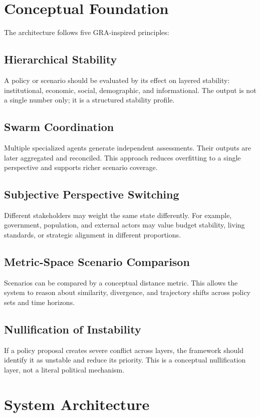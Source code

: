 \documentclass[11pt,a4paper]{article}
\begin{document}
\section{Conceptual Foundation}

The architecture follows five GRA-inspired principles:

\subsection{Hierarchical Stability}
A policy or scenario should be evaluated by its effect on layered stability: institutional, economic, social, demographic, and informational. The output is not a single number only; it is a structured stability profile.

\subsection{Swarm Coordination}
Multiple specialized agents generate independent assessments. Their outputs are later aggregated and reconciled. This approach reduces overfitting to a single perspective and supports richer scenario coverage.

\subsection{Subjective Perspective Switching}
Different stakeholders may weight the same state differently. For example, government, population, and external actors may value budget stability, living standards, or strategic alignment in different proportions.

\subsection{Metric-Space Scenario Comparison}
Scenarios can be compared by a conceptual distance metric. This allows the system to reason about similarity, divergence, and trajectory shifts across policy sets and time horizons.

\subsection{Nullification of Instability}
If a policy proposal creates severe conflict across layers, the framework should identify it as unstable and reduce its priority. This is a conceptual nullification layer, not a literal political mechanism.

\section{System Architecture}
\end{document}
